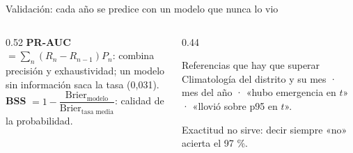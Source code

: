 \documentclass[aspectratio=169,11pt]{beamer}
\begin{document}
\begin{frame}{Validación: cada año se predice con un modelo que nunca lo vio}
\centering
{}
\par\vspace{0.4em}
\begin{columns}[T]
\begin{column}{0.52\textwidth}\small
\textbf{PR-AUC} $=\sum_n (R_n-R_{n-1})P_n$: combina precisión y exhaustividad; un modelo sin información saca la tasa (0,031).\\[3pt]
\textbf{BSS} $=1-\dfrac{\text{Brier}_{\text{modelo}}}{\text{Brier}_{\text{tasa media}}}$: calidad de la probabilidad.
\end{column}
\begin{column}{0.44\textwidth}
\begin{caja}{Referencias que hay que superar}
Climatología del distrito y su mes · mes del año · «hubo emergencia en $t$» · «llovió sobre p95 en $t$».
\end{caja}
{\scriptsize Exactitud no sirve: decir siempre «no» acierta el 97 \%.}
\end{column}
\end{columns}
\end{frame}
\end{document}
